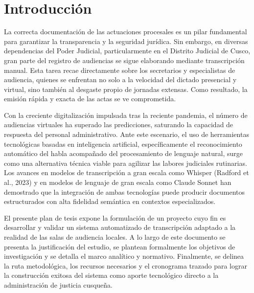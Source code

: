 \documentclass[12pt,a4paper,oneside]{article}
\begin{document}
\newpage
\tableofcontents

\newpage
\listoftables
{}

\newpage
\setcounter{page}{1}

\section{Introducci\'on}

La correcta documentaci\'on de las actuaciones procesales es un pilar fundamental para garantizar la transparencia y la seguridad jur\'idica. Sin embargo, en diversas dependencias del Poder Judicial, particularmente en el Distrito Judicial de Cusco, gran parte del registro de audiencias se sigue elaborando mediante transcripci\'on manual. Esta tarea recae directamente sobre los secretarios y especialistas de audiencia, quienes se enfrentan no solo a la velocidad del dictado presencial y virtual, sino tambi\'en al desgaste propio de jornadas extensas. Como resultado, la emisi\'on r\'apida y exacta de las actas se ve comprometida.

Con la creciente digitalizaci\'on impulsada tras la reciente pandemia, el n\'umero de audiencias virtuales ha superado las predicciones, saturando la capacidad de respuesta del personal administrativo. Ante este escenario, el uso de herramientas tecnol\'ogicas basadas en inteligencia artificial, espec\'ificamente el reconocimiento autom\'atico del habla acompa\~nado del procesamiento de lenguaje natural, surge como una alternativa t\'ecnica viable para agilizar las labores judiciales rutinarias. Los avances en modelos de transcripci\'on a gran escala como Whisper (Radford et al., 2023) y en modelos de lenguaje de gran escala como Claude Sonnet han demostrado que la integraci\'on de ambas tecnolog\'ias puede producir documentos estructurados con alta fidelidad sem\'antica en contextos especializados.

El presente plan de tesis expone la formulaci\'on de un proyecto cuyo fin es desarrollar y validar un sistema automatizado de transcripci\'on adaptado a la realidad de las salas de audiencia locales. A lo largo de este documento se presenta la justificaci\'on del estudio, se plantean formalmente los objetivos de investigaci\'on y se detalla el marco anal\'itico y normativo. Finalmente, se delinea la ruta metodol\'ogica, los recursos necesarios y el cronograma trazado para lograr la construcci\'on exitosa del sistema como aporte tecnol\'ogico directo a la administraci\'on de justicia cusque\~na.
\end{document}
